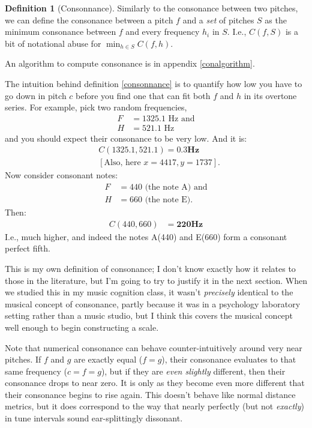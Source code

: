 \documentclass[letterpaper]{article}
\theoremstyle{definition}
\newtheorem{definition}{Definition}[section]
\begin{document}
{\begin{definition}[Consonnance]
Similarly to the consonance between two pitches, we can define the consonance between a pitch $f$ and a \emph{set} of pitches $S$ as the minimum consonance between $f$ and every frequency $h_i$ in $S$.  I.e., $C(f, S)$ is a bit of notational abuse for $\min_{h \in S} C(f, h)$.
\end{definition}
An algorithm to compute consonance is in appendix \ref{conalgorithm}.

The intuition behind definition \ref{consonnance} is to quantify how low you have to go down in pitch $c$ before you find one that can fit both $f$ and $h$ in its overtone series.  For example, pick two random frequencies,  
\begin{align*}
F &= 1325.1 \textrm{ Hz and}\\
H &= 521.1 \textrm{ Hz} 
\end{align*}
and you should expect their consonance to be very low. And it is:
\begin{align*}
&C(1325.1, 521.1) =\bm{ 0.3} \mathbf{ Hz} \\
&[ \textrm{Also, here }x = 4417, y=1737].  
\end{align*}
Now consider consonant notes:
\begin{align*}
F&= 440 \textrm{ (the note A) and}\\
H &= 660 \textrm{ (the note E)}. 
\end{align*}
Then:
\begin{align*}
C(440, 660) &=\bm{220} \mathbf{ Hz}
\end{align*}
I.e., much higher, and indeed the notes A(440) and E(660) form a consonant perfect fifth.

This is my own definition of consonance; I don't know exactly how it relates to those in the literature, but I'm going to try to justify it in the next section.  When we studied this in my music cognition class, it wasn't \emph{precisely} identical to the musical concept of consonance, partly because it was in a psychology laboratory setting rather than a music studio, but I think this covers the musical concept well enough to begin constructing a scale.

Note that numerical consonance can behave counter-intuitively around very near pitches.  If $f$ and $g$ are exactly equal ($f = g$), their consonance evaluates to that same frequency ($c = f = g$), but if they are \emph{even slightly} different, then their consonance drops to near zero.  It is only as they become even more different that their consonance begins to rise again.   This doesn't behave like normal distance metrics, but it does correspond to the way that nearly perfectly (but not \emph{exactly}) in tune intervals sound ear-splittingly dissonant.


}
\end{document}
